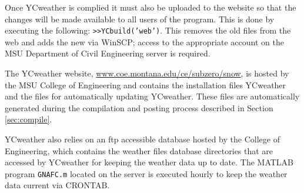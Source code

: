 Once YCweather is complied it must also be uploaded to the website so that the changes will be made available to all users of the program.  This is done by executing the following: \texttt{>>YCbuild('web')}.  This removes the old files from the web and adds the new via WinSCP; access to the appropriate account on the MSU Department of Civil Engineering server is required. 

\label{sec:web}
The YCweather website, \href{http://www.coe.montana.edu/ce/subzero/snow/}{www.coe.montana.edu/ce/subzero/snow}, is hosted by the MSU College of Engineering and contains the installation files YCweather and the files for automatically updating YCweather.  These files are automatically generated during the compilation and posting process described in Section \ref{sec:compile}.

YCweather also relies on an ftp accessible database hosted by the College of Engineering, which contains the weather files database directories that are accessed by YCweather for keeping the weather data up to date.  The MATLAB program \texttt{GNAFC.m} located on the server is executed hourly to keep the weather data current via CRONTAB.
